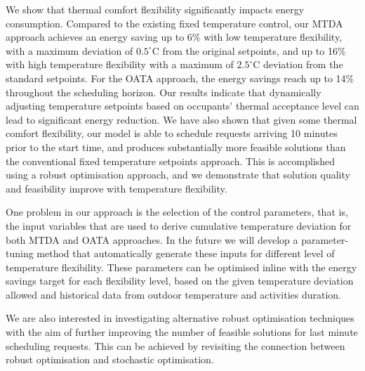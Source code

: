 We show that thermal comfort flexibility significantly impacts energy consumption. Compared to the existing fixed temperature control,  our MTDA approach achieves an energy saving up to 6\% with low temperature flexibility, with a maximum deviation of $0.5^{\circ}\mathrm{C}$ from the original setpoints, and up to 16\% with high temperature flexibility with a maximum of $2.5^{\circ}\mathrm{C}$ deviation from the standard setpoints. For the OATA approach, the energy savings reach up to 14\% throughout the scheduling horizon. Our results indicate that dynamically adjusting temperature setpoints based on occupants' thermal acceptance level can lead to significant energy reduction. We have also shown that given some thermal comfort flexibility, our model is able to schedule requests arriving 10 minutes prior to the start time, and produces substantially more feasible solutions than the conventional fixed temperature setpoints approach. This is accomplished using a robust optimisation approach, and we demonstrate that solution quality and feasibility improve with temperature flexibility.

One problem in our approach is the selection of the control parameters, that is, the input variables that are used to derive cumulative temperature deviation for both MTDA and OATA approaches. %
In the future we will develop a parameter-tuning method that automatically generate these inputs for different level of temperature flexibility. These parameters can be optimised inline with the energy savings target for each flexibility level, based on the given temperature deviation allowed and historical data from outdoor temperature and activities duration. 

We are also interested in investigating alternative robust optimisation techniques with the aim of further improving the number of feasible solutions for last minute scheduling requests. This can be achieved by revisiting the connection between robust optimisation and stochastic optimisation.%




